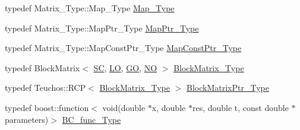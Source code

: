 \begin{DoxyCompactItemize}
typedef Matrix\+\_\+\+Type\+::\+Map\+\_\+\+Type \hyperlink{classFEDD_1_1FE__Test_a416d3abf702e778eb7fab3cd1feb3ede}{Map\+\_\+\+Type}
\item 
typedef Matrix\+\_\+\+Type\+::\+Map\+Ptr\+\_\+\+Type \hyperlink{classFEDD_1_1FE__Test_af41d3f3475a5ac2e0c7d3aab1b06102b}{Map\+Ptr\+\_\+\+Type}
\item 
typedef Matrix\+\_\+\+Type\+::\+Map\+Const\+Ptr\+\_\+\+Type \hyperlink{classFEDD_1_1FE__Test_ad09d94cdf8e7574fc9b6d1648fa18826}{Map\+Const\+Ptr\+\_\+\+Type}
\item 
typedef Block\+Matrix$<$ \hyperlink{fe__test__laplace_8cpp_a79c7e86a57edbb2a5a53242bcd04e41e}{SC}, \hyperlink{fe__test__laplace_8cpp_ad6a38c9f07d3fd633eefca5bccad8410}{LO}, \hyperlink{fe__test__laplace_8cpp_afa2946b509009b4f45eb04bd8c5b27d9}{GO}, \hyperlink{fe__test__laplace_8cpp_a5e24f37b28787429872b6ecb1d0417ce}{NO} $>$ \hyperlink{classFEDD_1_1FE__Test_a7018ca0596aed7f7641f1b3262ff7ead}{Block\+Matrix\+\_\+\+Type}
\item 
typedef Teuchos\+::\+R\+CP$<$ \hyperlink{classFEDD_1_1FE__Test_a7018ca0596aed7f7641f1b3262ff7ead}{Block\+Matrix\+\_\+\+Type} $>$ \hyperlink{classFEDD_1_1FE__Test_a2b1edc85a8fab435be53fb22b843af9d}{Block\+Matrix\+Ptr\+\_\+\+Type}
\item 
typedef boost\+::function$<$ void(double $\ast$x, double $\ast$res, double t, const double $\ast$parameters)$>$ \hyperlink{classFEDD_1_1FE__Test_a1ac70a79e5935320b05ecf16739ad8a4}{B\+C\+\_\+func\+\_\+\+Type}
\end{DoxyCompactItemize}
